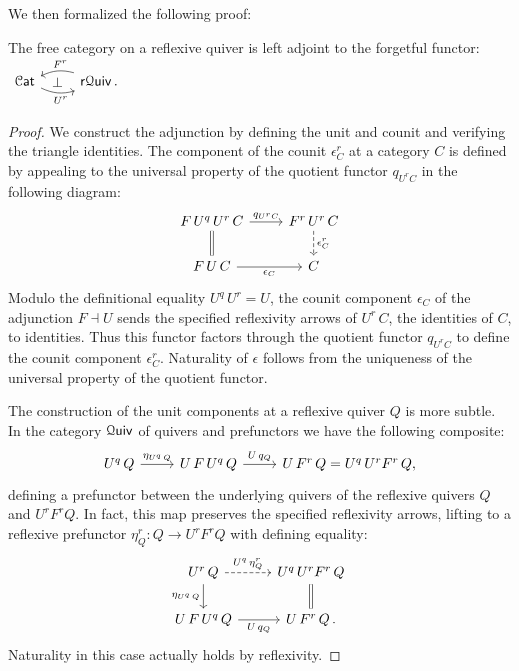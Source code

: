 \documentclass[a4paper,UKenglish,cleveref, autoref, thm-restate]{lipics-v2021}
\newcommand{\cat}[1]{\textup{\textsf{#1}}}%
\newcommand{\1}{\mathbbe{1}}
\newcommand{\2}{\mathbbe{2}}
\newcommand{\3}{\mathbbe{3}}
\newcommand{\Cat}{\mathcal{C}\cat{at}}
\newcommand{\Quiv}{\mathcal{Q}\cat{uiv}}
\newcommand{\rQuiv}{\cat{r}\mathcal{Q}\cat{uiv}}
\newcommand{\cdoc}[2][]{\href{https://leanprover-community.github.io/mathlib4_docs/find/?pattern=CategoryTheory.#1#2\#doc}{\texttt{#2}}}
\begin{document}
We then formalized the following proof:
\begin{proposition}[\cdoc{ReflQuiv.adj}]\label{prop:free-refl-quiv-adj}
  The free category on a reflexive quiver is left adjoint to the forgetful functor:
  $ \begin{tikzcd} \Cat \arrow[r, bend right=20, "U^r"' pos=.6] \arrow[r, phantom, "\bot"] & \rQuiv\,. \arrow[l, bend right=20, "F^r"' pos=.4] \end{tikzcd} $
\end{proposition}
\begin{proof}
We construct the adjunction by defining the unit and counit and verifying the triangle identities. The component of the counit $\epsilon^r_C$ at a category $C$ is defined by appealing to the universal property of the quotient functor $q_{U^rC}$ in the following diagram:
\[ \begin{tikzcd} F\,U^q\, U^r\, C \arrow[r, "q_{U^rC}"] \arrow[d, equals] & F^r\,U^r\, C \arrow[d, dashed, "\epsilon^r_C"] \\ F\,U\,C \arrow[r, "\epsilon_C"'] & C \end{tikzcd}\]
Modulo the definitional equality $U^q\,U^r=U$, the counit component $\epsilon_C$ of the adjunction $F \dashv U$ sends the specified reflexivity arrows of $U^r\,C$, the identities of $C$, to identities. Thus this functor factors through the quotient functor $q_{U^rC}$ to define the counit component $\epsilon^r_C$. Naturality of $\epsilon$ follows from the uniqueness of the universal property of the quotient functor.

The construction of the unit components at a reflexive quiver $Q$ is more subtle. In the category $\Quiv$ of quivers and prefunctors we have the following composite: \[ \begin{tikzcd} U^q\,Q \arrow[r, "\eta_{U^q\,Q}"] & U\,F\,U^q\,Q \arrow[r, "U\,q_Q"] & U\,F^r\,Q  = U^q\,U^rF^r\,Q, \end{tikzcd}\] defining a prefunctor between the underlying quivers of the reflexive quivers $Q$ and $U^rF^rQ$. In fact, this map preserves the specified reflexivity arrows, lifting to a reflexive prefunctor $\eta^r_Q \colon Q \to U^r F^r Q$ with defining equality:
\[ \begin{tikzcd} U^r\, Q \arrow[d, "\eta_{U^q\,Q}"'] \arrow[r, "U^q\,\eta^r_Q", dashed] & U^q\,U^rF^r\,Q \arrow[d, equals] \\ U\,F\,U^q\,Q\arrow[r, "U\,q_Q"'] & U\,F^r\,Q\, . \end{tikzcd}\]
Naturality in this case actually holds by reflexivity.


\end{proof}
\end{document}

